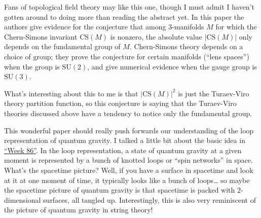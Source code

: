 \documentclass{article}
\def\tightlist{}
\renewcommand{\texttt}[1]{%
  \begingroup
  \ttfamily
  \begingroup\lccode`~=`/\lowercase{\endgroup\def~}{/\discretionary{}{}{}}%
  \begingroup\lccode`~=`[\lowercase{\endgroup\def~}{[\discretionary{}{}{}}%
  \begingroup\lccode`~=`.\lowercase{\endgroup\def~}{.\discretionary{}{}{}}%
  \catcode`/=\active\catcode`[=\active\catcode`.=\active
  \scantokens{#1\noexpand}%
  \endgroup
}
\begin{document}

Fans of topological field theory may like this one, though I must admit
I haven't gotten around to doing more than reading the abstract yet. In
this paper the authors give evidence for the conjecture that among
3-manifolds \(M\) for which the Chern-Simons invariant
\(\mathrm{CS}(M)\) is nonzero, the absolute value \(|\mathrm{CS}(M)|\)
only depends on the fundamental group of \(M\). Chern-Simons theory
depends on a choice of group; they prove the conjecture for certain
manifolds (``lens spaces'') when the group is \(\mathrm{SU}(2)\), and
give numerical evidence when the gauge group is \(\mathrm{SU}(3)\).

What's interesting about this to me is that \(|\mathrm{CS}(M)|^2\) is
just the Turaev-Viro theory partition function, so this conjecture is
saying that the Turaev-Viro theories discussed above have a tendency to
notice only the fundamental group.


This wonderful paper should really push forwards our understanding of
the loop representation of quantum gravity. I talked a little bit about
the basic idea in \protect\hyperlink{week86}{``Week 86''}. In the loop
representation, a state of quantum gravity at a given moment is
represented by a bunch of knotted loops or ``spin networks'' in space.
What's the spacetime picture? Well, if you have a surface in spacetime
and look at it at one moment of time, it typically looks like a bunch of
loops\ldots{} so maybe the spacetime picture of quantum gravity is that
spacetime is packed with \(2\)-dimensional surfaces, all tangled up.
Interestingly, this is also very reminiscent of the picture of quantum
gravity in string theory!
\end{document}
